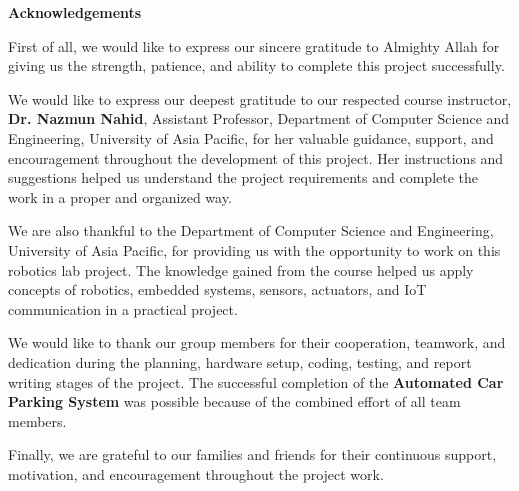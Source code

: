
\newpage
\thispagestyle{plain}
\begin{center}

    \vspace*{0.1cm}
    \Large
    \textbf{Acknowledgements}\\
    \vspace{0.5cm}

\end{center}

First of all, we would like to express our sincere gratitude to Almighty Allah for giving us the strength, patience, and ability to complete this project successfully.

We would like to express our deepest gratitude to our respected course instructor, \textbf{Dr. Nazmun Nahid}, Assistant Professor, Department of Computer Science and Engineering, University of Asia Pacific, for her valuable guidance, support, and encouragement throughout the development of this project. Her instructions and suggestions helped us understand the project requirements and complete the work in a proper and organized way.

We are also thankful to the Department of Computer Science and Engineering, University of Asia Pacific, for providing us with the opportunity to work on this robotics lab project. The knowledge gained from the course helped us apply concepts of robotics, embedded systems, sensors, actuators, and IoT communication in a practical project.

We would like to thank our group members for their cooperation, teamwork, and dedication during the planning, hardware setup, coding, testing, and report writing stages of the project. The successful completion of the \textbf{Automated Car Parking System} was possible because of the combined effort of all team members.

Finally, we are grateful to our families and friends for their continuous support, motivation, and encouragement throughout the project work.

